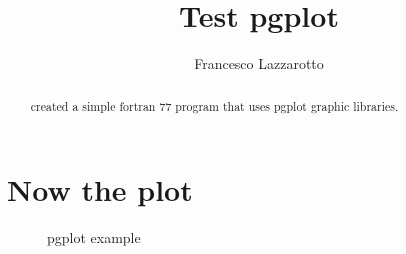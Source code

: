 \documentclass[a4paper,10pt]{article}
\title{Test pgplot}
\author{Francesco Lazzarotto}
\begin{document}
\maketitle

\begin{abstract}
created a simple fortran 77 program that uses pgplot graphic libraries.
\end{abstract}
\newpage
\section{Now the plot}
\begin{figure}[!ht]

\caption{pgplot example}
\end{figure}
\end{document}
